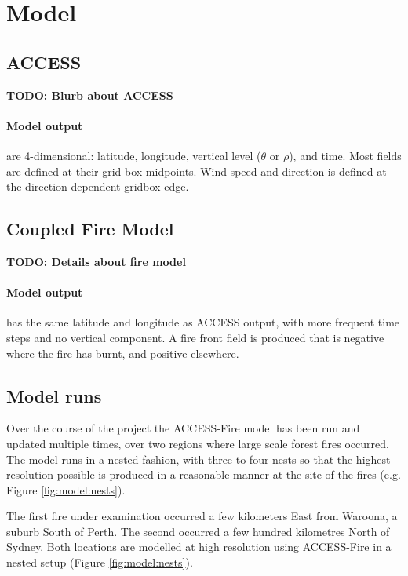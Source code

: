 \section{Model} 
  \label{model}

  \subsection{ACCESS}  
    \textbf{TODO: Blurb about ACCESS}
    
    \paragraph{Model output} are 4-dimensional: latitude, longitude, vertical level ($\theta$ or $\rho$), and time. Most fields are defined at their grid-box midpoints. Wind speed and direction is defined at the direction-dependent gridbox edge.
    
    
  \subsection{Coupled Fire Model}
    \textbf{TODO: Details about fire model}
    
    \paragraph{Model output} has the same latitude and longitude as ACCESS output, with more frequent time steps and no vertical component.
    A fire front field is produced that is negative where the fire has burnt, and positive elsewhere.
    
  
  
  
  \subsection{Model runs}
    Over the course of the project the ACCESS-Fire model has been run and updated multiple times, over two regions where large scale forest fires occurred.
    The model runs in a nested fashion, with three to four nests so that the highest resolution possible is produced in a reasonable manner at the site of the fires (e.g. Figure \ref{fig:model:nests}).
    
    The first fire under examination occurred a few kilometers East from Waroona, a suburb South of Perth.
    The second occurred a few hundred kilometres North of Sydney. 
    Both locations are modelled at high resolution using ACCESS-Fire in a nested setup (Figure \ref{fig:model:nests}).
    
